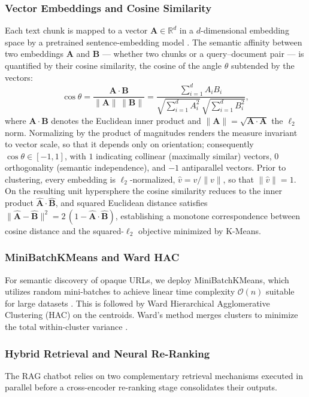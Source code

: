 \documentclass[a4paper,12pt]{article}
\begin{document}
\subsubsection{Vector Embeddings and Cosine Similarity}
Each text chunk is mapped to a vector $\mathbf{A} \in \mathbb{R}^d$ in a $d$-dimensional embedding space by a pretrained sentence-embedding model \cite{reimers2019sentencebert}. The semantic affinity between two embeddings $\mathbf{A}$ and $\mathbf{B}$ --- whether two chunks or a query--document pair --- is quantified by their cosine similarity, the cosine of the angle $\theta$ subtended by the vectors:
$$\cos\theta = \frac{\mathbf{A} \cdot \mathbf{B}}{\|\mathbf{A}\|\,\|\mathbf{B}\|} = \frac{\sum_{i=1}^{d} A_i B_i}{\sqrt{\sum_{i=1}^{d} A_i^2}\,\sqrt{\sum_{i=1}^{d} B_i^2}},$$
where $\mathbf{A} \cdot \mathbf{B}$ denotes the Euclidean inner product and $\|\mathbf{A}\| = \sqrt{\mathbf{A} \cdot \mathbf{A}}$ the $\ell_2$ norm. Normalizing by the product of magnitudes renders the measure invariant to vector scale, so that it depends only on orientation; consequently $\cos\theta \in [-1, 1]$, with $1$ indicating collinear (maximally similar) vectors, $0$ orthogonality (semantic independence), and $-1$ antiparallel vectors. Prior to clustering, every embedding is $\ell_2$-normalized, $\hat{v} = v / \|v\|$, so that $\|\hat{v}\| = 1$. On the resulting unit hypersphere the cosine similarity reduces to the inner product $\hat{\mathbf{A}} \cdot \hat{\mathbf{B}}$, and squared Euclidean distance satisfies $\|\hat{\mathbf{A}} - \hat{\mathbf{B}}\|^2 = 2\,(1 - \hat{\mathbf{A}} \cdot \hat{\mathbf{B}})$, establishing a monotone correspondence between cosine distance and the squared-$\ell_2$ objective minimized by K-Means.

\subsubsection{MiniBatchKMeans and Ward HAC}
For semantic discovery of opaque URLs, we deploy MiniBatchKMeans, which utilizes random mini-batches to achieve linear time complexity $\mathcal{O}(n)$ suitable for large datasets \cite{sculley2010web}. This is followed by Ward Hierarchical Agglomerative Clustering (HAC) on the centroids. Ward's method merges clusters to minimize the total within-cluster variance \cite{ward1963hierarchical}.

\subsubsection{Hybrid Retrieval and Neural Re-Ranking}
\label{sec:theory_hybrid}
The RAG chatbot relies on two complementary retrieval mechanisms executed in parallel before a cross-encoder re-ranking stage consolidates their outputs.
\end{document}
